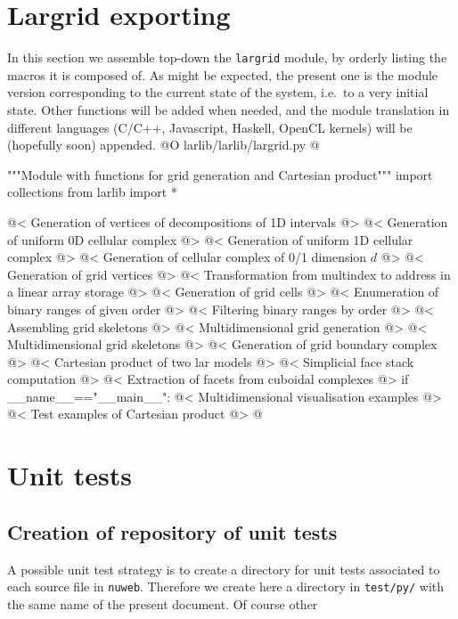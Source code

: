 \documentclass[11pt,oneside]{article}	%
\begin{document}
\section{Largrid exporting}
\label{sec:largrid}
In this section we assemble top-down the \texttt{largrid} module, by orderly listing the macros it is composed of. As might be expected, the present one is the module version corresponding to the current state of the system, i.e.~to a very initial state. Other functions will be added when needed, and the module translation in different languages (C/C++, Javascript, Haskell, OpenCL kernels) will be (hopefully soon) appended.
@O larlib/larlib/largrid.py
@{"""Module with functions for grid generation and Cartesian product"""
import collections
from larlib import *

@< Generation of vertices of decompositions of 1D intervals  @>
@< Generation of uniform 0D cellular complex  @>
@< Generation of uniform 1D cellular complex  @>
@< Generation of cellular complex of 0/1 dimension $d$ @>
@< Generation of grid vertices  @>
@< Transformation from multindex to address in a linear array storage @>
@< Generation of grid cells  @>
@< Enumeration of binary ranges of given order @>
@< Filtering binary ranges by order @>
@< Assembling grid skeletons @>
@< Multidimensional grid generation @>
@< Multidimensional grid skeletons @>
@< Generation of grid boundary complex @>
@< Cartesian product of two lar models   @>
@< Simplicial face stack computation @>
@< Extraction of facets from cuboidal complexes @>
if __name__=="__main__":
	@< Multidimensional visualisation examples @>
	@< Test examples of Cartesian product @>
@}


\section{Unit tests}
\label{sec:tests}

\subsection{Creation of repository of unit tests}

A possible unit test strategy is to create a directory for unit tests associated to each source file in \texttt{nuweb}. Therefore we create here a directory in \texttt{test/py/} with the same name of the present document. Of course other 
\end{document}
